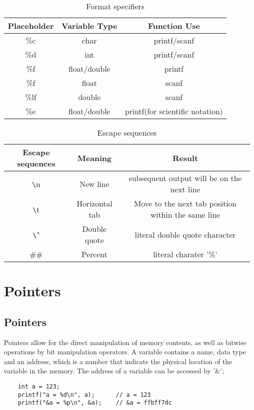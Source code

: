 \documentclass[12pt]{article} %
\begin{document}
\begin{table}[h]
    \centering
    \begin{tabular}{|c|c|c|}
    \hline
    Placeholder & Variable Type & Function Use \\ \hline
    \%c & char & printf/scanf \\ \hline
    \%d & int & printf/scanf \\ \hline
    \%f & float/double & printf \\ \hline
    \%f & float & scanf \\ \hline
    \%lf & double & scanf \\ \hline
    \%e & float/double & printf(for scientific notation) \\ \hline

    \end{tabular}
    \caption{Format specifiers}
\end{table}

\begin{table}[h]
    \centering
    \begin{tabular}{|c|c|c|}
    \hline
    Escape sequences & Meaning & Result \\ \hline
    \texttt{\textbackslash}n & New line & subsequent output will be on the next line \\ \hline
    \texttt{\textbackslash}t & Horizontal tab & Move to the next tab position within the same line \\ \hline
    \texttt{\textbackslash}" & Double quote & literal double quote character \\ \hline
    \#\# & Percent & literal charater '\%' \\ \hline

    \end{tabular}
    \caption{Escape sequences}
\end{table}

\section{Pointers}
\subsection{Pointers}
Pointers allow for the direct manipulation of memory contents, as well as bitwise operations by bit manipulation operators.
A variable contains a name, data type and an address, which is a number that indicate the physical location of the variable in the memory.
The address of a variable can be accessed by '\&';
\begin{lstlisting}
    int a = 123;
    printf("a = %d\n", a);      // a = 123
    printf("&a = %p\n", &a);    // &a = ffbff7dc
\end{lstlisting}
\end{document}
